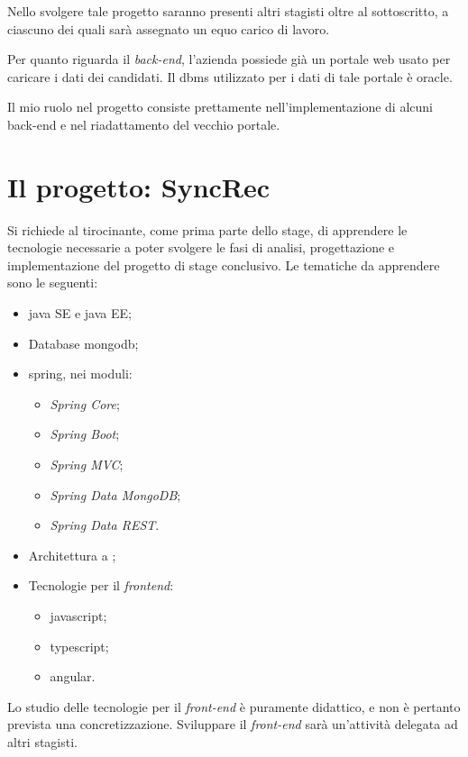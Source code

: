 Nello svolgere tale progetto saranno presenti altri stagisti oltre al sottoscritto, a ciascuno dei quali sarà assegnato un equo carico di lavoro.

Per quanto riguarda il \textit{back-end}, l'azienda possiede già un portale web usato per caricare i dati dei candidati. Il \gls{dbms} utilizzato per i dati di tale portale è \gls{oracle}\gloss.

Il mio ruolo nel progetto consiste prettamente nell'implementazione di alcuni  back-end e nel riadattamento del vecchio portale.


\section{Il progetto: SyncRec}

Si richiede al tirocinante, come prima parte dello stage, di apprendere le tecnologie necessarie a poter svolgere le fasi di analisi, progettazione e implementazione del progetto di stage conclusivo.
Le tematiche da apprendere sono le seguenti:
\begin{itemize}
	\item \gls{java} SE e \gls{java} EE;
	\item Database \gls{mongodb};
	\item \gls{spring}\gloss, nei moduli:
	\begin{itemize}[noitemsep]
		\item \textit{Spring Core};
		\item \textit{Spring Boot};
		\item \textit{Spring MVC};
		\item \textit{Spring Data MongoDB};
		\item \textit{Spring Data REST}.
	\end{itemize}
	\item Architettura a ;
	\item Tecnologie per il \textit{frontend}:
	\begin{itemize}[noitemsep]
		\item \gls{javascript}\gloss;
		\item \gls{typescript}\gloss;
		\item \gls{angular}.
	\end{itemize}
\end{itemize}

Lo studio delle tecnologie per il \textit{front-end} è puramente didattico, e non è pertanto prevista una concretizzazione.
Sviluppare il \textit{front-end} sarà un'attività delegata ad altri stagisti.

